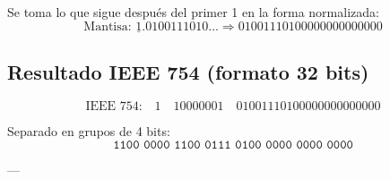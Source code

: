 \documentclass[a4paper,12pt]{article}
\begin{document}
\begin{center}
		Se toma lo que sigue después del primer 1 en la forma normalizada:
		\vspace{-0.5em}
		\[
		\text{Mantisa: } \underline{1}.0100111010... \Rightarrow 01001110100000000000000
		\]
		
		\subsection*{Resultado IEEE 754 (formato 32 bits)}
		
		\[
		\text{IEEE 754:} \quad 
		\boxed{1} \quad \boxed{10000001} \quad \boxed{01001110100000000000000}
		\]
		
		Separado en grupos de 4 bits:
		\vspace{-0.5em}
		\[
		\texttt{1100\ 0000\ 1100\ 0111\ 0100\ 0000\ 0000\ 0000}
		\]

		---	
	\end{center}		
\end{document}
